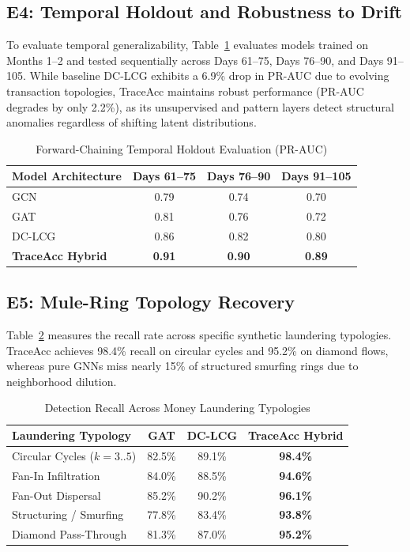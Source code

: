 \documentclass[journal]{IEEEtran}
\begin{document}
\subsection{E4: Temporal Holdout and Robustness to Drift}
To evaluate temporal generalizability, Table~\ref{tab:temporal_holdout} evaluates models trained on Months 1--2 and tested sequentially across Days 61--75, Days 76--90, and Days 91--105. While baseline DC-LCG exhibits a 6.9\% drop in PR-AUC due to evolving transaction topologies, TraceAcc maintains robust performance (PR-AUC degrades by only 2.2\%), as its unsupervised and pattern layers detect structural anomalies regardless of shifting latent distributions.

\begin{table}[t]
\centering
\caption{Forward-Chaining Temporal Holdout Evaluation (PR-AUC)}
\label{tab:temporal_holdout}
\begin{tabular}{lccc}
\toprule
\textbf{Model Architecture} & \textbf{Days 61--75} & \textbf{Days 76--90} & \textbf{Days 91--105} \\
\midrule
GCN \cite{kipf2017semi} & 0.79 & 0.74 & 0.70 \\
GAT \cite{velickovic2018graph} & 0.81 & 0.76 & 0.72 \\
DC-LCG \cite{li2026dclcg} & 0.86 & 0.82 & 0.80 \\
\textbf{TraceAcc Hybrid} & \textbf{0.91} & \textbf{0.90} & \textbf{0.89} \\
\bottomrule
\end{tabular}
\end{table}

\subsection{E5: Mule-Ring Topology Recovery}
Table~\ref{tab:topology_recall} measures the recall rate across specific synthetic laundering typologies. TraceAcc achieves 98.4\% recall on circular cycles and 95.2\% on diamond flows, whereas pure GNNs miss nearly 15\% of structured smurfing rings due to neighborhood dilution.

\begin{table}[t]
\centering
\caption{Detection Recall Across Money Laundering Typologies}
\label{tab:topology_recall}
\begin{tabular}{lccc}
\toprule
\textbf{Laundering Typology} & \textbf{GAT \cite{velickovic2018graph}} & \textbf{DC-LCG \cite{li2026dclcg}} & \textbf{TraceAcc Hybrid} \\
\midrule
Circular Cycles ($k=3..5$) & 82.5\% & 89.1\% & \textbf{98.4\%} \\
Fan-In Infiltration & 84.0\% & 88.5\% & \textbf{94.6\%} \\
Fan-Out Dispersal & 85.2\% & 90.2\% & \textbf{96.1\%} \\
Structuring / Smurfing & 77.8\% & 83.4\% & \textbf{93.8\%} \\
Diamond Pass-Through & 81.3\% & 87.0\% & \textbf{95.2\%} \\
\bottomrule
\end{tabular}
\end{table}
\end{document}

